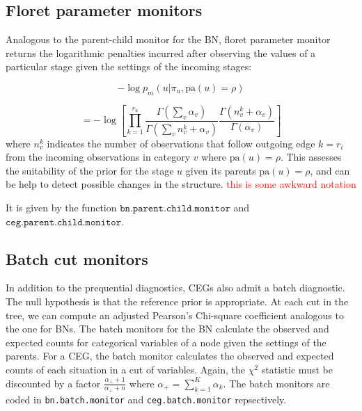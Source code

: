 \documentclass[12pt]{article}
\begin{document}
\subsection{Floret parameter monitors} %

Analogous to the parent-child monitor for the BN, floret parameter monitor returns the logarithmic penalties incurred after observing the values of a particular stage given the settings of the incoming stages:

\[
-\log p_m( u | \pi_u, \text{pa}(u) = \rho)
\]
 
 \[
=-\log \left[ \prod_{k=1} ^ {r_u} \frac{\Gamma (\sum_v \alpha_v)}{\Gamma(\sum_v n_v^k + \alpha_v)}  \frac{\Gamma(n_v^k + \alpha_v)}{\Gamma(\alpha_v)} \right]
 \]
  where $n_v^k$ indicates the number of observations that follow outgoing edge $k=r_i$ from the incoming observations in category $v$ where $\text{pa}(u) = \rho$. This assesses the suitability of the prior for the stage $u$ given its parents  $\text{pa}(u) = \rho$, and can be help to detect possible changes in the structure. \textcolor{red}{this is some awkward notation}
  
  It is given by the function $\texttt{bn.parent.child.monitor}$ and $\texttt{ceg.parent.child.monitor}$. 

%
%

\subsection{Batch cut monitors}
In addition to the prequential diagnostics, CEGs also admit a batch diagnostic. The null hypothesis is that the reference prior is appropriate. At each cut in the tree, we can compute an adjusted Pearson's Chi-square coefficient analogous to the one for BNs.  The batch monitors for the BN calculate the observed and expected counts for categorical variables of a node given the settings of the parents. For a CEG, the batch monitor calculates the observed and expected counts of each situation in a cut of variables.
Again, the $\chi^2$ statistic must be discounted by a factor $\frac{\alpha_+ + 1}{\alpha_+ + n }$ where $\alpha_+ = \sum_{k=1}^K \alpha_k$. The batch monitors are coded in \texttt{bn.batch.monitor} and \texttt{ceg.batch.monitor} repsectively.
\end{document}
